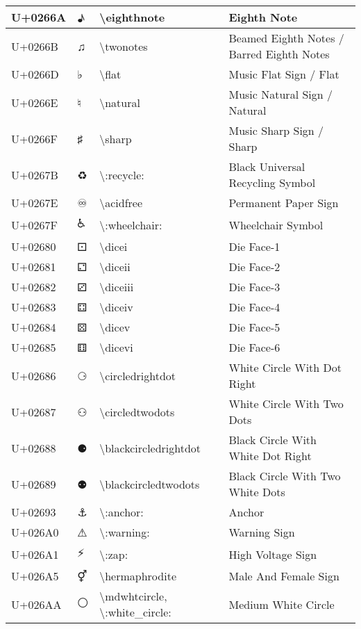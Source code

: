 \begin{table}[h]
\begin{tabulary}{\linewidth}{|L|L|L|L|}
\hline
U+0266A & ♪ & {\textbackslash}eighthnote & Eighth Note \\
\hline
U+0266B & ♫ & {\textbackslash}twonotes & Beamed Eighth Notes / Barred Eighth Notes \\
\hline
U+0266D & ♭ & {\textbackslash}flat & Music Flat Sign / Flat \\
\hline
U+0266E & ♮ & {\textbackslash}natural & Music Natural Sign / Natural \\
\hline
U+0266F & ♯ & {\textbackslash}sharp & Music Sharp Sign / Sharp \\
\hline
U+0267B & ♻ & {\textbackslash}:recycle: & Black Universal Recycling Symbol \\
\hline
U+0267E & ♾ & {\textbackslash}acidfree & Permanent Paper Sign \\
\hline
U+0267F & ♿ & {\textbackslash}:wheelchair: & Wheelchair Symbol \\
\hline
U+02680 & ⚀ & {\textbackslash}dicei & Die Face-1 \\
\hline
U+02681 & ⚁ & {\textbackslash}diceii & Die Face-2 \\
\hline
U+02682 & ⚂ & {\textbackslash}diceiii & Die Face-3 \\
\hline
U+02683 & ⚃ & {\textbackslash}diceiv & Die Face-4 \\
\hline
U+02684 & ⚄ & {\textbackslash}dicev & Die Face-5 \\
\hline
U+02685 & ⚅ & {\textbackslash}dicevi & Die Face-6 \\
\hline
U+02686 & ⚆ & {\textbackslash}circledrightdot & White Circle With Dot Right \\
\hline
U+02687 & ⚇ & {\textbackslash}circledtwodots & White Circle With Two Dots \\
\hline
U+02688 & ⚈ & {\textbackslash}blackcircledrightdot & Black Circle With White Dot Right \\
\hline
U+02689 & ⚉ & {\textbackslash}blackcircledtwodots & Black Circle With Two White Dots \\
\hline
U+02693 & ⚓ & {\textbackslash}:anchor: & Anchor \\
\hline
U+026A0 & ⚠ & {\textbackslash}:warning: & Warning Sign \\
\hline
U+026A1 & ⚡ & {\textbackslash}:zap: & High Voltage Sign \\
\hline
U+026A5 & ⚥ & {\textbackslash}hermaphrodite & Male And Female Sign \\
\hline
U+026AA & ⚪ & {\textbackslash}mdwhtcircle, {\textbackslash}:white\_circle: & Medium White Circle \\

\end{tabulary}
\end{table}
